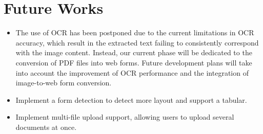 \documentclass[12pt,oneside,openright,a4paper]{cpe-english-project}
\begin{document}
\section{Future Works}

\begin{itemize}
  \item The use of OCR has been postponed due to the current limitations in OCR accuracy, which result in the extracted text failing to consistently correspond with the image content.  Instead, our current phase will be dedicated to the conversion of PDF files into web forms.  Future development plans will take into account the improvement of OCR performance and the integration of image-to-web form conversion.
  
  \item Implement a form detection to detect more layout and support a tabular.
  
  \item Implement multi-file upload support, allowing users to upload several documents at once.
\end{itemize}





\makeatletter
\g@addto@macro{\UrlBreaks}{\UrlOrds}
\makeatother
% 



\end{document}
